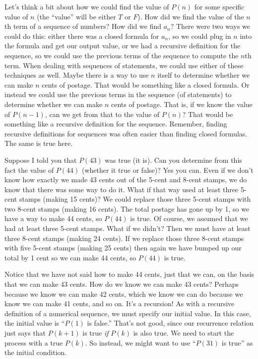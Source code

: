 \documentclass[12pt]{article}
\begin{document}
Let's think a bit about how we could find the value of $P(n)$ for some specific value of $n$ (the ``value'' will be either $T$ or $F$).  How did we find the value of the $n$th term of a sequence of numbers? How did we find $a_n$?  There were two ways we could do this: either there was a closed formula for $a_n$, so we could plug in $n$ into the formula and get our output value, or we had a recursive definition for the sequence, so we could use the previous terms of the sequence to compute the $n$th term.  When dealing with sequences of statements, we could use either of these techniques as well.  Maybe there is a way to use $n$ itself to determine whether we can make $n$ cents of postage.  That would be something like a closed formula.  Or instead we could use the previous terms in the sequence (of statements) to determine whether we can make $n$ cents of postage.  That is, if we know the value of $P(n-1)$, can we get from that to the value of $P(n)$?  That would be something like a recursive definition for the sequence.  Remember, finding recursive definitions for sequences was often easier than finding closed formulas.  The same is true here.

Suppose I told you that $P(43)$ was true (it is).  Can you determine from this fact the value of $P(44)$ (whether it true or false)?  Yes you can. Even if we don't know how exactly we made 43 cents out of the 5-cent and 8-cent stamps, we do know that there was some way to do it.  What if that way used at least three 5-cent stamps  (making 15 cents)?  We could replace those three 5-cent stamps with two 8-cent stamps (making 16 cents).  The total postage has gone up by 1, so we have a way to make 44 cents, so $P(44)$ is true.  Of course, we assumed that we had at least three 5-cent stamps.  What if we didn't? Then we must have at least three 8-cent stamps (making 24 cents).  If we replace those three 8-cent stamps with five 5-cent stamps (making 25 cents) then again we have bumped up our total by 1 cent so we can make 44 cents, so $P(44)$ is true.  

Notice that we have not said how to make 44 cents, just that we can, on the basis that we can make 43 cents.  How do we know we can make 43 cents?  Perhaps because we know we can make 42 cents, which we know we can do because we know we can make 41 cents, and so on.  It's a recursion!  As with a recursive definition of a numerical sequence, we must specify our initial value.  In this case, the initial value is ``$P(1)$ is false.''  That's not good, since our recurrence relation just says that $P(k+1)$ is true {\em if} $P(k)$ is also true.  We need to start the process with a true $P(k)$.  So instead, we might want to use ``$P(31)$ is true'' as the initial condition.
\end{document}
